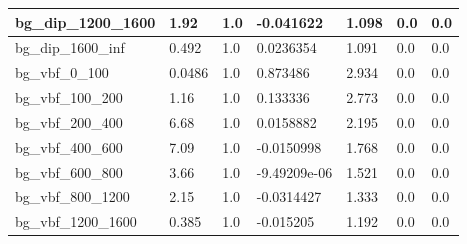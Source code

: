 \documentclass[a4paper, 10pt]{article}
\begin{document}
\begin{table}[H]
\begin{center}
\begin{tabular}{|m{23.0mm}|m{23.0mm}|m{18.0mm}|m{19.0mm}|m{19.0mm}|m{19.0mm}|m{19.0mm}|}
      \hline
      {\cellcolor{white}         bg\_dip\_1200\_1600}& {\cellcolor{white}         1.92}& {\cellcolor{white}         1.0}& {\cellcolor{white}         -0.041622}& {\cellcolor{white}         1.098}& {\cellcolor{green}         0.0}& {\cellcolor{green}         0.0}\\
      \hline
      {\cellcolor{white}         bg\_dip\_1600\_inf}& {\cellcolor{white}         0.492}& {\cellcolor{white}         1.0}& {\cellcolor{white}         0.0236354}& {\cellcolor{white}         1.091}& {\cellcolor{green}         0.0}& {\cellcolor{green}         0.0}\\
      \hline
      {\cellcolor{white}         bg\_vbf\_0\_100}& {\cellcolor{white}         0.0486}& {\cellcolor{white}         1.0}& {\cellcolor{white}         0.873486}& {\cellcolor{white}         2.934}& {\cellcolor{green}         0.0}& {\cellcolor{green}         0.0}\\
      \hline
      {\cellcolor{white}         bg\_vbf\_100\_200}& {\cellcolor{white}         1.16}& {\cellcolor{white}         1.0}& {\cellcolor{white}         0.133336}& {\cellcolor{white}         2.773}& {\cellcolor{green}         0.0}& {\cellcolor{green}         0.0}\\
      \hline
      {\cellcolor{white}         bg\_vbf\_200\_400}& {\cellcolor{white}         6.68}& {\cellcolor{white}         1.0}& {\cellcolor{white}         0.0158882}& {\cellcolor{white}         2.195}& {\cellcolor{green}         0.0}& {\cellcolor{green}         0.0}\\
      \hline
      {\cellcolor{white}         bg\_vbf\_400\_600}& {\cellcolor{white}         7.09}& {\cellcolor{white}         1.0}& {\cellcolor{white}         -0.0150998}& {\cellcolor{white}         1.768}& {\cellcolor{green}         0.0}& {\cellcolor{green}         0.0}\\
      \hline
      {\cellcolor{white}         bg\_vbf\_600\_800}& {\cellcolor{white}         3.66}& {\cellcolor{white}         1.0}& {\cellcolor{white}         -9.49209e-06}& {\cellcolor{white}         1.521}& {\cellcolor{green}         0.0}& {\cellcolor{green}         0.0}\\
      \hline
      {\cellcolor{white}         bg\_vbf\_800\_1200}& {\cellcolor{white}         2.15}& {\cellcolor{white}         1.0}& {\cellcolor{white}         -0.0314427}& {\cellcolor{white}         1.333}& {\cellcolor{green}         0.0}& {\cellcolor{green}         0.0}\\
      \hline
      {\cellcolor{white}         bg\_vbf\_1200\_1600}& {\cellcolor{white}         0.385}& {\cellcolor{white}         1.0}& {\cellcolor{white}         -0.015205}& {\cellcolor{white}         1.192}& {\cellcolor{green}         0.0}& {\cellcolor{green}         0.0}\\

\end{tabular}
\end{center}
\end{table}
\end{document}
